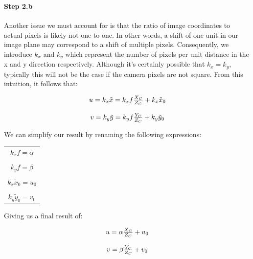 \documentclass[]{article}
\begin{document}
	\textbf{Step 2.b}\\\\
	Another issue we must account for is that the ratio of image coordinates to actual pixels is likely not one-to-one. In other words, a shift of one unit in our image plane may correspond to a shift of multiple pixels. Consequently, we introduce $k_x$ and $k_y$ which represent the number of pixels per unit distance in the x and y direction respectively. Although it's certainly possible that $k_x = k_y$, typically this will not be the case if the camera pixels are not square. From this intuition, it follows that:
	
	\begin{center}
		\begin{equation}
		\begin{tabular}{c}
		$u = k_x\tilde{x} = k_xf\frac{X_C}{Z_C} + k_x\tilde{x}_0$\\
		\\
		$v = k_y\tilde{y} = k_yf\frac{Y_C}{Z_C} + k_y\tilde{y}_0$
		\end{tabular}
		\end{equation}
	\end{center}
	
	We can simplify our result by renaming the following expressions:
	\begin{center}
		\begin{tabular}{c}
			$k_xf = \alpha$\\
			\\
			$k_yf = \beta$\\
			\\
			$k_x\tilde{x}_0 = u_0$\\
			\\
			$k_y\tilde{y}_0 = v_0$
		\end{tabular}
	\end{center}
	
	Giving us a final result of:
	
	\begin{center}
		\begin{equation}
		\begin{tabular}{c}
		$u = \alpha\frac{X_C}{Z_C} + u_0$\\
		\\
		$v = \beta\frac{Y_C}{Z_C} + v_0$
		\end{tabular}
		\end{equation}
	\end{center}
	
\end{document}
